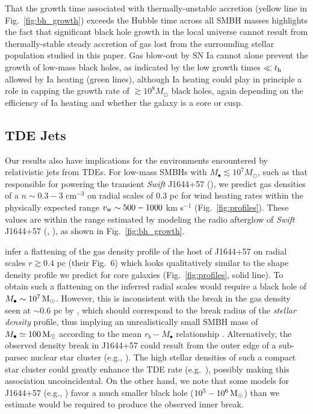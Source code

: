 \documentclass[usenatbib,fleqn]{mn2e}
\newcommand{\Mbh}[1][]{M_{\bullet#1}}
\begin{document}
That the growth time associated with thermally-unstable accretion
(yellow line in Fig.~\ref{fig:bh_growth}) exceeds the Hubble time
across all SMBH masses highlights the fact that significant black hole
growth in the local universe cannot result from thermally-stable
steady accretion of gas lost from the surrounding stellar population
studied in this paper.  Gas blow-out by SN Ia cannot alone prevent the
growth of low-mass black holes, as indicated by the low growth times
$\ll t_{\rm h}$ allowed by Ia heating (green lines), although Ia
heating could play in principle a role in capping the growth rate of
$\gtrsim 10^{8}M_{\odot}$ black holes, again depending on the
efficiency of Ia heating and whether the galaxy is a core or cusp.


\subsection{TDE Jets}
\label{sec:TDE}

Our results also have implications for the environments encountered by
relativistic jets from TDEs.  For low-mass SMBHs with $M_{\bullet}
\lesssim 10^{7}M_{\odot}$, such as that responsible for powering the
transient {\it Swift} J1644+57 (\citealt{Bloom+11}), we predict gas
densities of a $n \sim 0.3-3$ cm$^{-3}$ on radial scales of 0.3 pc for
wind heating rates within the physically expected range $v_{\rm w}
\sim 500-1000$ km s$^{-1}$ (Fig.~\ref{fig:profiles}).  These values
are within the range estimated by modeling the radio afterglow of {\it
  Swift} J1644+57 (\citealt{Metzger+12},
\citealt{BergerZauderer+:2012a}), as shown in
Fig.~\ref{fig:bh_growth}.

\citet{BergerZauderer+:2012a} infer a flattening of the gas density
profile of the host of J1644+57 on radial scales $r \gtrsim 0.4$ pc
(their Fig.~6) which looks qualitatively similar to the shape density
profile we predict for core galaxies (Fig.~\ref{fig:profiles}, solid
line).  To obtain such a flattening on the inferred radial scales
would require a black hole of $\Mbh\sim 10^7 \Msun$.  However, this is
inconsistent with the break in the gas density seen at $\sim 0.6$ pc
by \citet{BergerZauderer+:2012a}, which should correspond to the break
radius of the {\it stellar density} profile, thus implying an
unrealistically small SMBH mass of $\Mbh\simeq 100\Msun$ according to
the mean $r_b-M_{\bullet}$ relationship \citep{LauerFaber+:2007a}.
Alternatively, the observed density break in J1644+57 could result
from the outer edge of a sub-parsec nuclear star cluster (e.g.,
\citealt{Carson+15}).  The high stellar densities of such a compact
star cluster could greatly enhance the TDE rate
(e.g.~\citealt{Stone&Metzger15}), possibly making this association
uncoincidental.  On the other hand, we note that some models for
J1644+57 (e.g., \citealt{Tchekhovskoy+2014}) favor a much smaller
black hole ($10^5-10^6 \,{\rm M_\odot}$) than we estimate would be required to
produce the observed inner break.
\end{document}
